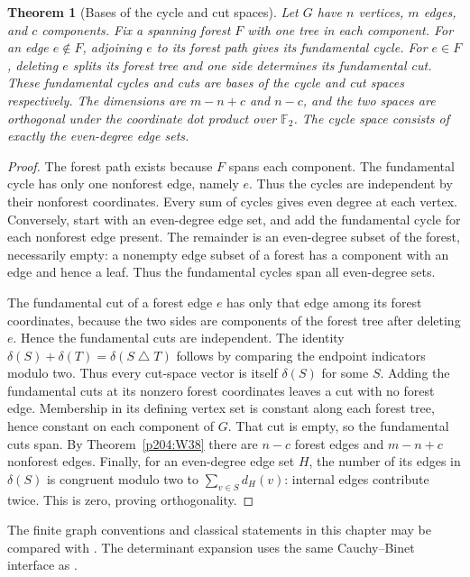 \documentclass[11pt,oneside,openany]{book}
\theoremstyle{plain}
\newtheorem{theorem}{Theorem}[chapter]
\theoremstyle{definition}
\theoremstyle{remark}
\begin{document}
\begin{theorem}[Bases of the cycle and cut spaces]\label{p204:W43}
Let \(G\) have \(n\) vertices, \(m\) edges, and \(c\) components.
Fix a spanning forest \(F\) with one tree in each component.
For an edge \(e\notin F\), adjoining \(e\) to its forest path gives
its fundamental cycle. For \(e\in F\), deleting \(e\) splits its
forest tree and one side determines its fundamental cut. These
fundamental cycles and cuts are bases of the cycle and cut spaces
respectively. The dimensions are \(m-n+c\) and \(n-c\), and the two
spaces are orthogonal under the coordinate dot product over
\(\mathbb{F}_2\). The cycle space consists of exactly the even-degree
edge sets.
\end{theorem}

\begin{proof}
The forest path exists because \(F\) spans each component. The
fundamental cycle has only one nonforest edge, namely \(e\). Thus
the cycles are independent by their nonforest coordinates. Every
sum of cycles gives even degree at each vertex. Conversely, start
with an even-degree edge set, and add the fundamental cycle for each
nonforest edge present. The remainder is an even-degree subset of
the forest, necessarily empty: a nonempty edge subset of a forest
has a component with an edge and hence a leaf. Thus the fundamental
cycles span all even-degree sets.

The fundamental cut of a forest edge \(e\) has only that edge among
its forest coordinates, because the two sides are components of
the forest tree after deleting \(e\). Hence the fundamental cuts
are independent. The identity
\(\delta(S)+\delta(T)=\delta(S\mathbin{\triangle}T)\) follows by
comparing the endpoint indicators modulo two. Thus every cut-space
vector is itself \(\delta(S)\) for some \(S\). Adding the fundamental
cuts at its nonzero forest coordinates leaves a cut with no forest
edge. Membership in its defining vertex set is constant along
each forest tree, hence constant on each component of \(G\).
That cut is empty, so the fundamental cuts span. By
Theorem~\ref{p204:W38} there are \(n-c\) forest edges and \(m-n+c\)
nonforest edges. Finally, for an even-degree edge set \(H\),
the number of its edges in \(\delta(S)\) is congruent modulo two to
\(\sum_{v\in S}d_H(v)\): internal edges contribute twice. This is
zero, proving orthogonality.
\end{proof}

The finite graph conventions and classical statements in this chapter
may be compared with \cite[Chapters 3--5, 18, and 20]{BM}.
The determinant expansion uses the same Cauchy--Binet interface as
\cite{D05}.
\end{document}
